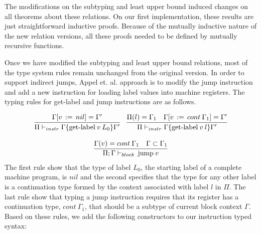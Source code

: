 \documentclass[review]{elsarticle}
\theoremstyle{definition}
\begin{document}
The modifications on the subtyping and least upper bound induced changes on all theorems
about these relations. On our first implementation, these results are just straightforward
inductive proofs. Because of the mutually inductive nature of the new relation versions, all
these proofs needed to be defined by mutually recursive functions.

Once we have modified the subtyping and least upper bound relations, most of the type system
rules remain unchanged from the original version. In order to support indirect jumps, Appel et. al.
approach is to modify the jump instruction and add a new instruction for loading label values into
machine registers. The typing rules for get-label and jump instructions are as follows.

\[
\begin{array}{cc}
  \infer{\Pi\vdash_{instr} \Gamma \{\textrm{get-label}\:v\:L_0\}\Gamma'}
        {\Gamma[v\,:=\,nil] = \Gamma'} &
  \infer{\Pi\vdash_{instr} \Gamma \{\textrm{get-label}\:v\:l\}\Gamma'}
        {\Pi(l) = \Gamma_1 & \Gamma[v\,:=\,cont\:\Gamma_1] = \Gamma'} \\ & \\
  \multicolumn{2}{c}{
    \infer{\Pi;\Gamma\vdash_{block}\,\textrm{jump}\:v}
          {\Gamma(v) = cont\:\Gamma_1 & \Gamma \subset \Gamma_1}
  }
\end{array}
\]
The first rule show that the type of label $L_0$, the starting label of a complete machine program,
is $nil$ and the second specifies that the type for any other label is a continuation type formed by
the context associated with label $l$ in $\Pi$. The last rule show that typing a jump instruction
requires that its register has a continuation type, $cont\:\Gamma_1$, that should be a subtype of
current block context $\Gamma$. Based on these rules, we add the following constructors to our
instruction typed syntax:
\end{document}
